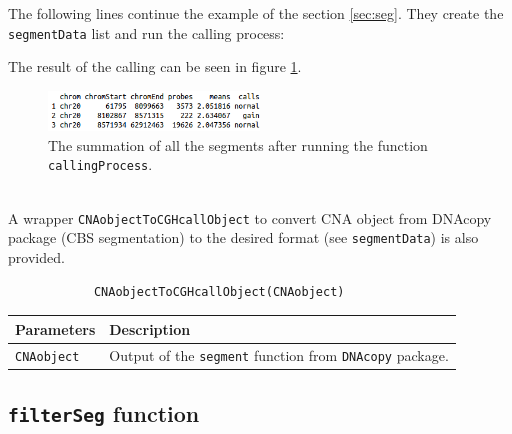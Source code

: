 \documentclass[a4paper,10pt]{article}
\begin{document}
		The following lines continue the example of the section \ref{sec:seg}. They create the \texttt{segmentData} list and run the calling process:
		
\begin{Schunk}
\end{Schunk}
		
		The result of the calling can be seen in figure \ref{callsoutput}.
		
		\begin{figure}[!h]
			\centering
			\includegraphics[width=0.5\textwidth]{fig/callsoutput2}
			\caption{The summation of all the segments after running the function \texttt{callingProcess}.}
			\label{callsoutput}
		\end{figure}
		~~\\				
		A wrapper \texttt{CNAobjectToCGHcallObject} to convert CNA object from DNAcopy package \cite{DNAcopy} (CBS segmentation) to the desired format (see \texttt{segmentData}) is also provided.
		
		\begin{verbatim}
			CNAobjectToCGHcallObject(CNAobject)
		\end{verbatim}
		
		\begin{center}
			\begin{tabular}{|l|l|}
				\hline
				Parameters & Description\\
				\hline
				\texttt{CNAobject} & Output of the \texttt{segment} function from \texttt{DNAcopy} package.\\
				\hline	
			\end{tabular}		
		\end{center}
		
		
		\subsection{\texttt{filterSeg} function}
			
\end{document}
